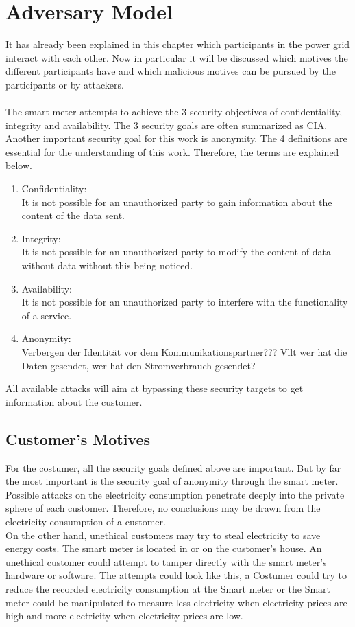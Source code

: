 \section{Adversary Model}
It has already been explained in this chapter which participants in the power grid interact with each other. Now in particular it will be discussed which motives the different participants have and which malicious motives can be pursued by the participants or by attackers.  \\
\\
The smart meter attempts to achieve the 3 security objectives of confidentiality, integrity and availability. The 3 security goals are often summarized as CIA. Another important security goal for this work is anonymity. The 4 definitions are essential for the understanding of this work. Therefore, the terms are explained below.
\begin{enumerate}
\item Confidentiality: \\
It is not possible for an unauthorized party to gain information about the content of the data sent.
\item Integrity:\\
It is not possible for an unauthorized party to modify the content of data without data without this being noticed.
\item Availability: \\
It is not possible for an unauthorized party to interfere with the functionality of a service.
\item Anonymity:\\
Verbergen der Identität vor dem Kommunikationspartner???
Vllt wer hat die Daten gesendet, wer hat den Stromverbrauch gesendet?
\end{enumerate}
 
 
All available attacks will aim at bypassing these security targets to get information about the customer. 
\subsection{Customer's Motives}
For the costumer, all the security goals defined above are important. But by far the most important is the security goal of anonymity through the smart meter. Possible attacks on the electricity consumption penetrate deeply into the private sphere of each customer. Therefore, no conclusions may be drawn from the electricity consumption of a customer.\\
On the other hand, unethical customers may try to steal electricity to save energy costs. The smart meter is located in or on the customer's house. An unethical customer could attempt to tamper directly with the smart meter's hardware or software. The attempts could look like this, a Costumer could try to reduce the recorded electricity consumption at the Smart meter or the Smart meter could be manipulated to measure less electricity when electricity prices are high and more electricity when electricity prices are low.
